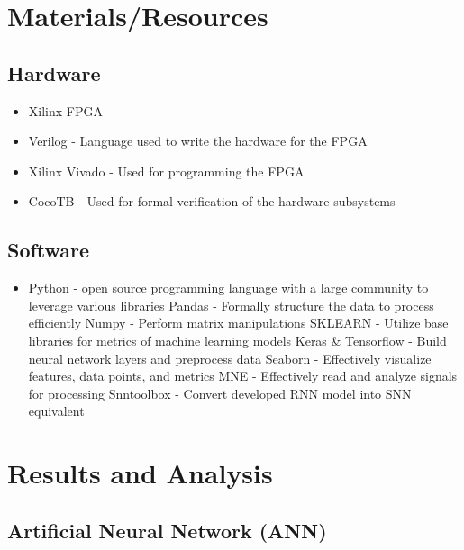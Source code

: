 \documentclass[12pt,titlepage]{article}
\begin{document}
\section{Materials/Resources}
\subsection{Hardware}
\begin{itemize}
	\item Xilinx FPGA
	\item Verilog - Language used to write the hardware for the FPGA
	\item Xilinx Vivado - Used for programming the FPGA
	\item CocoTB - Used for formal verification of the hardware subsystems
\end{itemize}	

\subsection{Software}
\begin{itemize}
	\item Python - open source programming language with a large community to leverage various libraries
		\subitem Pandas - Formally structure the data to process efficiently
		\subitem Numpy - Perform matrix manipulations 
		\subitem SKLEARN - Utilize base libraries for metrics of machine learning models
		\subitem Keras \& Tensorflow - Build neural network layers and preprocess data
		\subitem Seaborn - Effectively visualize features, data points, and metrics
		\subitem MNE - Effectively read and analyze signals for processing
		\subitem Snntoolbox - Convert developed RNN model into SNN equivalent
\end{itemize}	

\section{Results and Analysis}
\subsection{Artificial Neural Network (ANN)}
\end{document}
